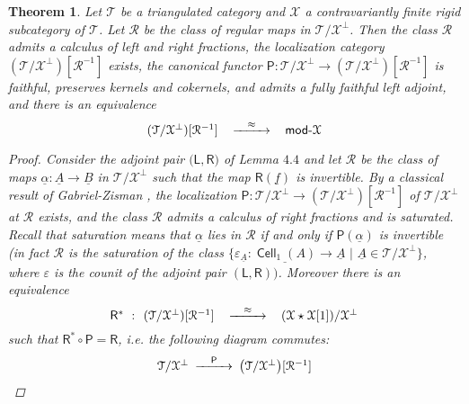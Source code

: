 \documentclass[oneside, a4paper,reqno]{amsart}
\numberwithin{equation}{section}
\newtheorem{thm}{Theorem}[section]
\theoremstyle{definition}
\begin{document}
\begin{thm} Let ${\mathcal T}$ be a triangulated category and ${\mathcal X}$ a contravariantly finite rigid subcategory of ${\mathcal T}$. Let $\mathcal R$ be the class of regular maps in ${\mathcal T}/{\mathcal X}^{\bot}$. Then the class $\mathcal R$ admits a calculus of  left and right fractions, the localization category $({\mathcal T}/{\mathcal X}^{\bot})[\mathcal R^{-1}]$ exists, the canonical functor $\mathsf{P} \colon {\mathcal T}/{\mathcal X}^{\bot} {\longrightarrow} ({\mathcal T}/{\mathcal X}^{\bot})[\mathcal R^{-1}]$ is faithful, preserves kernels and cokernels, and admits a fully faithful left adjoint, and  there is an equivalence
\[
\begin{CD}
 ({\mathcal T}/{\mathcal X}^{\bot})[\mathcal R^{-1}]\,\,\  @> \approx >> \,\,\ \operatorname*{\mathsf{mod}-\!}{\mathcal X}
\end{CD}
\] 
\begin{proof} Consider the adjoint pair 
$\big(\mathsf{L}, \mathsf{R}\big)$ of Lemma $4.4$ and let $\mathcal R$ be the class of maps $\underline{\alpha} \colon {\underline A} {\longrightarrow} {\underline B}$ in ${\mathcal T}/{\mathcal X}^{\bot}$ such that the map $\mathsf{R}({\underline f})$ is invertible. By a classical result of Gabriel-Zisman \cite[Chapter 1]{GZ}, the localization $\mathsf{P} \colon {\mathcal T}/{\mathcal X}^{\bot} {\longrightarrow} ({\mathcal T}/{\mathcal X}^{\bot})[\mathcal R^{-1}]$ of ${\mathcal T}/{\mathcal X}^{\bot}$ at  $\mathcal R$ exists, and the class $\mathcal R$ admits a calculus of right fractions and is saturated.  Recall that saturation means that $\underline{\alpha}$ lies in $\mathcal R$ if and only if $\mathsf{P}(\underline{\alpha})$ is invertible (in fact $\mathcal R$ is the saturation of the class $\{\varepsilon_{\underline A} \colon \underline{\operatorname*{{\mathsf{Cell}}}_{1}(A)} {\longrightarrow} {\underline A} \,\, | \,\, {\underline A} \in {\mathcal T}/{\mathcal X}^{\bot}\}$, where $\varepsilon$ is the counit of the adjoint pair $(\mathsf{L}, \mathsf{R}))$. Moreover there is an equivalence 
\[
\begin{CD}
\mathsf{R}^{*} \,\ \colon \,\,   ({\mathcal T}/{\mathcal X}^{\bot})[\mathcal R^{-1}]\,\,\  @> \approx >> \,\,\ ({\mathcal X}\star{\mathcal X}[1])/{\mathcal X}^{\bot}
\end{CD}
\] 
 such that $\mathsf{R}^{*} \circ \mathsf{P} = \mathsf{R}$, i.e. the following diagram commutes:
\begin{equation}
\begin{CD}
{\mathcal T}/{\mathcal X}^{\bot} @> \mathsf{P} >> \big({\mathcal T}/{\mathcal X}^{\bot}\big)[\mathcal R^{-1}] \\

\end{CD}
\end{equation}
\end{proof}
\end{thm}
\end{document}
